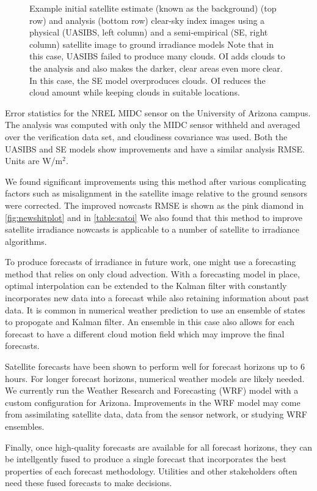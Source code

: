 \begin{figure}[htb]
\caption[Improved satellite irradiance estimates using optimal
interpolation]{Example initial satellite estimate (known as the
  background) (top row) and analysis (bottom row) clear-sky index
  images using a physical (UASIBS, left column) and a semi-empirical
  (SE, right column) satellite image to ground irradiance models Note
  that in this case, UASIBS failed to produce many clouds. OI adds
  clouds to the analysis and also makes the darker, clear areas even
  more clear.  In this case, the SE model overproduces clouds. OI
  reduces the cloud amount while keeping clouds in suitable
  locations.}
\label{fig:oi_example}
\end{figure}

\begin{table}[htb]
  \caption[Optimal interpolation error metrics]{
    Error statistics for the NREL MIDC sensor on the University
    of Arizona campus. The analysis was computed with only the MIDC
    sensor withheld and averaged over the verification data set, and
    cloudiness covariance was used. Both the
    UASIBS and SE models show improvements and have a similar
    analysis RMSE\@. Units are W/m$^2$.}
\label{table:satoi}
\vspace{0.5em}

\centering
\end{table}


We found significant improvements using this method after various
complicating factors such as misalignment in the satellite image
relative to the ground sensors were corrected.
The improved nowcasts RMSE is shown as the pink diamond in
\cref{fig:newshitplot} and in \cref{table:satoi}
We also found that this method to improve satellite irradiance
nowcasts is applicable to a number of satellite to irradiance
algorithms.

To produce forecasts of irradiance in future work, one might use a
forecasting method that relies on only cloud advection.
With a forecasting model in place, optimal interpolation can be
extended to the Kalman filter with constantly incorporates new data
into a forecast while also retaining information about past data.
It is common in numerical weather prediction to use an ensemble of
states to propogate and Kalman filter.
An ensemble in this case also allows for each forecast to have a
different cloud motion field which may improve the final forecasts.

Satellite forecasts have been shown to perform well for forecast
horizons up to 6 hours.
For longer forecast horizons, numerical weather models are likely
needed.
We currently run the Weather Research and Forecasting (WRF) model with
a custom configuration for Arizona.
Improvements in the WRF model may come from assimilating satellite
data, data from the sensor network, or studying WRF ensembles.

Finally, once high-quality forecasts are available for all forecast
horizons, they can be intellgently fused to produce a single forecast
that incorporates the best properties of each forecast methodology.
Utilities and other stakeholders often need these fused forecasts to
make decisions.


